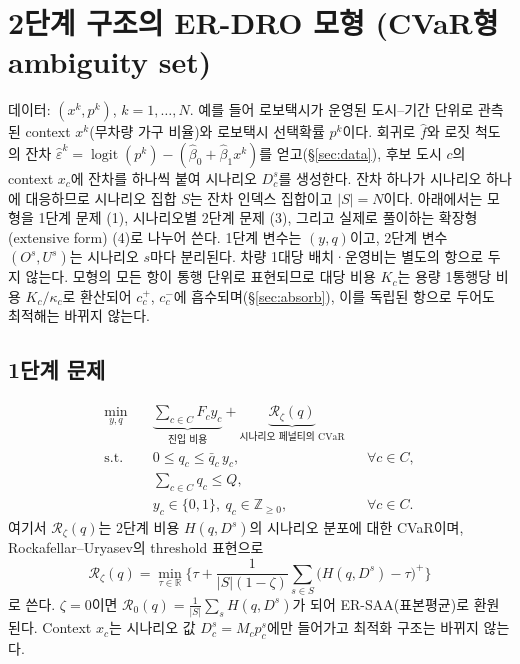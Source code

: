 \documentclass[10pt,a4paper]{article}
\DeclareMathOperator{\logit}{logit}
\begin{document}

\section{2단계 구조의 ER-DRO 모형 (CVaR형 ambiguity set)}

데이터: $(x^k,p^k)$, $k=1,\dots,N$. 예를 들어 로보택시가 운영된 도시--기간 단위로 관측된 context $x^k$(무차량 가구 비율)와 로보택시 선택확률 $p^k$이다. 회귀로 $\hat f$와 로짓 척도의 잔차 $\hat\varepsilon^k=\logit(p^k)-(\hat\beta_0+\hat\beta_1x^k)$를 얻고(\S\ref{sec:data}), 후보 도시 $c$의 context $x_c$에 잔차를 하나씩 붙여 시나리오 $D_c^s$를 생성한다. 잔차 하나가 시나리오 하나에 대응하므로 시나리오 집합 $S$는 잔차 인덱스 집합이고 $|S|=N$이다.
아래에서는 모형을 1단계 문제 (1), 시나리오별 2단계 문제 (3), 그리고 실제로 풀이하는 확장형(extensive form) (4)로 나누어 쓴다. 1단계 변수는 $(y,q)$이고, 2단계 변수 $(O^s,U^s)$는 시나리오 $s$마다 분리된다.
차량 1대당 배치·운영비는 별도의 항으로 두지 않는다. 모형의 모든 항이 통행 단위로 표현되므로 대당 비용 $K_c$는 용량 1통행당 비용 $K_c/\kappa_c$로 환산되어 $c_c^+$, $c_c^-$에 흡수되며(\S\ref{sec:absorb}), 이를 독립된 항으로 두어도 최적해는 바뀌지 않는다.

\subsection{1단계 문제}

\begin{subequations}\label{eq:first}
\begin{align}
\min_{y,q}\quad
 & \underbrace{\sum_{c\in C}F_c y_c}_{\text{진입 비용}}
 + \underbrace{\mathcal R_\zeta(q)}_{\text{시나리오 페널티의 CVaR}} \label{eq:1a}\\
\text{s.t.}\quad
 & 0\le q_c\le \bar q_c\,y_c, && \forall c\in C, \label{eq:1b}\\
 & \sum_{c\in C} q_c\le Q, \label{eq:1c}\\
 & y_c\in\{0,1\},\ q_c\in\mathbb Z_{\ge 0}, && \forall c\in C. \label{eq:1d}
\end{align}
\end{subequations}
여기서 $\mathcal R_\zeta(q)$는 2단계 비용 $H(q,D^s)$의 시나리오 분포에 대한 CVaR이며, Rockafellar--Uryasev의 threshold 표현으로
\begin{equation}\label{eq:cvar}
\mathcal R_\zeta(q)=\min_{\tau\in\mathbb R}\Big\{\tau+\frac{1}{|S|(1-\zeta)}\sum_{s\in S}\big(H(q,D^s)-\tau\big)^+\Big\}
\end{equation}
로 쓴다. $\zeta=0$이면 $\mathcal R_0(q)=\frac1{|S|}\sum_s H(q,D^s)$가 되어 ER-SAA(표본평균)로 환원된다. Context $x_c$는 시나리오 값 $D_c^s=M_c p_c^s$에만 들어가고 최적화 구조는 바뀌지 않는다.
\end{document}
